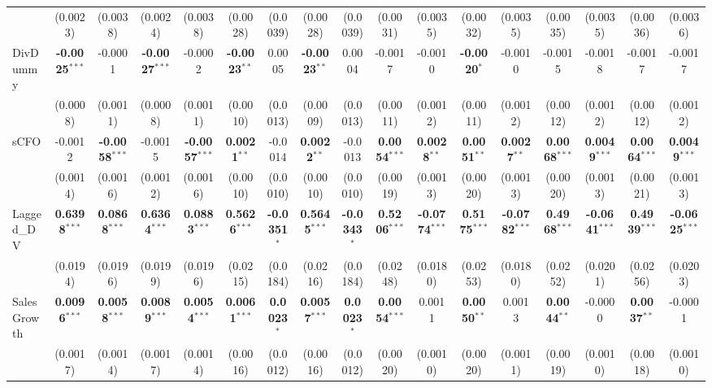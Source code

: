 \begin{landscape}
\begin{table}[H]
\begin{tabular}{lcccccccccccccccc}
 & (0.0023) & (0.0038) & (0.0024) & (0.0038) & (0.0028) & (0.0039) & (0.0028) & (0.0039) & (0.0031) & (0.0035) & (0.0032) & (0.0035) & (0.0035) & (0.0035) & (0.0036) & (0.0036) \\
DivDummy & \textbf{-0.0025}$^{***}$ & -0.0001 & \textbf{-0.0027}$^{***}$ & -0.0002 & \textbf{-0.0023}$^{**}$ & 0.0005 & \textbf{-0.0023}$^{**}$ & 0.0004 & -0.0017 & -0.0010 & \textbf{-0.0020}$^{*}$ & -0.0010 & -0.0015 & -0.0018 & -0.0017 & -0.0017 \\
 & (0.0008) & (0.0011) & (0.0008) & (0.0011) & (0.0010) & (0.0013) & (0.0009) & (0.0013) & (0.0011) & (0.0012) & (0.0011) & (0.0012) & (0.0012) & (0.0012) & (0.0012) & (0.0012) \\
sCFO & -0.0012 & \textbf{-0.0058}$^{***}$ & -0.0015 & \textbf{-0.0057}$^{***}$ & \textbf{0.0021}$^{**}$ & -0.0014 & \textbf{0.0022}$^{**}$ & -0.0013 & \textbf{0.0054}$^{***}$ & \textbf{0.0028}$^{**}$ & \textbf{0.0051}$^{**}$ & \textbf{0.0027}$^{**}$ & \textbf{0.0068}$^{***}$ & \textbf{0.0049}$^{***}$ & \textbf{0.0064}$^{***}$ & \textbf{0.0049}$^{***}$ \\
 & (0.0014) & (0.0016) & (0.0012) & (0.0016) & (0.0010) & (0.0010) & (0.0010) & (0.0010) & (0.0019) & (0.0013) & (0.0020) & (0.0013) & (0.0020) & (0.0013) & (0.0021) & (0.0013) \\
Lagged\_DV & \textbf{0.6398}$^{***}$ & \textbf{0.0868}$^{***}$ & \textbf{0.6364}$^{***}$ & \textbf{0.0883}$^{***}$ & \textbf{0.5626}$^{***}$ & \textbf{-0.0351}$^{*}$ & \textbf{0.5645}$^{***}$ & \textbf{-0.0343}$^{*}$ & \textbf{0.5206}$^{***}$ & \textbf{-0.0774}$^{***}$ & \textbf{0.5175}$^{***}$ & \textbf{-0.0782}$^{***}$ & \textbf{0.4968}$^{***}$ & \textbf{-0.0641}$^{***}$ & \textbf{0.4939}$^{***}$ & \textbf{-0.0625}$^{***}$ \\
 & (0.0194) & (0.0196) & (0.0199) & (0.0196) & (0.0215) & (0.0184) & (0.0216) & (0.0184) & (0.0248) & (0.0180) & (0.0253) & (0.0180) & (0.0252) & (0.0201) & (0.0256) & (0.0203) \\
SalesGrowth & \textbf{0.0096}$^{***}$ & \textbf{0.0058}$^{***}$ & \textbf{0.0089}$^{***}$ & \textbf{0.0054}$^{***}$ & \textbf{0.0061}$^{***}$ & \textbf{0.0023}$^{*}$ & \textbf{0.0057}$^{***}$ & \textbf{0.0023}$^{*}$ & \textbf{0.0054}$^{***}$ & 0.0011 & \textbf{0.0050}$^{**}$ & 0.0013 & \textbf{0.0044}$^{**}$ & -0.0000 & \textbf{0.0037}$^{**}$ & -0.0001 \\
 & (0.0017) & (0.0014) & (0.0017) & (0.0014) & (0.0016) & (0.0012) & (0.0016) & (0.0012) & (0.0020) & (0.0010) & (0.0020) & (0.0011) & (0.0019) & (0.0010) & (0.0018) & (0.0010) \\

\end{tabular}
\end{table}
\end{landscape}
